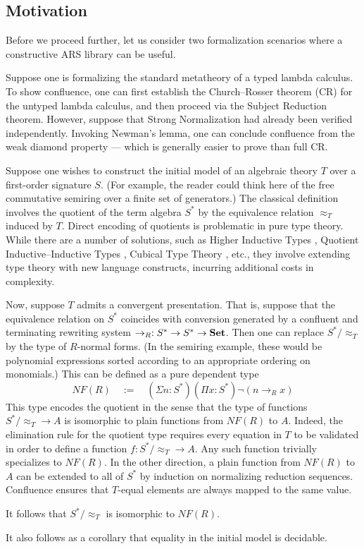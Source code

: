 \subsection{Motivation}

Before we proceed further, let us consider two formalization scenarios where
a constructive ARS library can be useful.

\begin{example}
Suppose one is formalizing the standard metatheory of
a typed lambda calculus.  To show confluence, one can
first establish the Church--Rosser theorem (CR) for the untyped lambda calculus,
and then proceed via the Subject Reduction theorem.
However, suppose that Strong Normalization had already been verified independently.
Invoking Newman's lemma, one can conclude confluence from the weak
diamond property --- which is generally easier to prove than full CR.
\end{example}

\begin{example}
Suppose one wishes to construct the initial model of an algebraic theory $T$
over a first-order signature $S$.
(For example, the reader could think here of the free commutative semiring over a finite set of generators.)
The classical definition involves the quotient of the term algebra $S^*$ by
the equivalence relation $\approx_T$ induced by $T$.
Direct encoding of quotients is problematic in pure type theory.
While there are a number of solutions, such as Higher Inductive Types \cite{HoTT},
Quotient Inductive--Inductive Types \cite{QIIT}, Cubical Type Theory \cite{CTT}, etc.,
they involve extending type theory with new language constructs,
incurring additional costs in complexity.

Now, suppose $T$ admits a convergent presentation.
That is, suppose that the equivalence relation on $S^*$ coincides
with conversion generated by a confluent and terminating rewriting system
$\to_R : S^* \to S^* \to \mathbf{Set}$.
Then one can replace $S^*/{\approx_T}$ by the type of $R$-normal forms.
(In the semiring example, these would be polynomial expressions sorted according to 
an appropriate ordering on monomials.)
This can be defined as a pure dependent type
\[ NF(R) \quad := \quad (\Sigma n : S^*) (\Pi x : S^*) \lnot (n \to_R x) \]
This type encodes the quotient in the sense that the type of functions $S^*/{\approx_T} \to A$ is isomorphic to plain functions from $NF(R)$ to $A$.
Indeed, the elimination rule for the quotient type requires every equation in $T$
to be validated in order to define a function $f : S^*/{\approx_T} \to A$.
Any such function trivially specializes to $NF(R)$.  In the other direction,
a plain function from $NF(R)$ to $A$
can be extended to all of $S^*$ by induction on normalizing reduction sequences.
Confluence ensures that $T$-equal elements are always mapped to the same value.

It follows that $S^*/{\approx_T}$ is isomorphic to $NF(R)$.

It also follows as a corollary that equality in the initial model is decidable.
\end{example}

